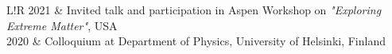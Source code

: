 \documentclass[letterpaper, onecolumn, 11pt]{article}
\newcommand\VRule{\color{lightgray}\vrule width 0.5pt}
\begin{document}
\begin{tabular}{L!{\VRule}R}
  2021 & Invited talk and participation in Aspen Workshop on \textit{"Exploring Extreme Matter"}, USA \\
  2020 & Colloquium at Department of Physics, University of Helsinki, Finland \\

\end{tabular}
\end{document}
